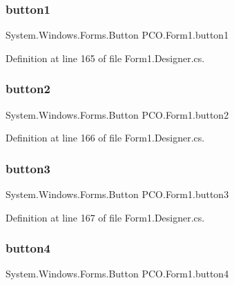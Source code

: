 \subsubsection{\texorpdfstring{button1}{button1}}
{\footnotesize\ttfamily System.\+Windows.\+Forms.\+Button P\+C\+O.\+Form1.\+button1\hspace{0.3cm}{\ttfamily [private]}}



Definition at line 165 of file Form1.\+Designer.\+cs.

\mbox{\label{classPCO_1_1Form1_ad629df09d9f3eb537456ea999592562f}} 
\subsubsection{\texorpdfstring{button2}{button2}}
{\footnotesize\ttfamily System.\+Windows.\+Forms.\+Button P\+C\+O.\+Form1.\+button2\hspace{0.3cm}{\ttfamily [private]}}



Definition at line 166 of file Form1.\+Designer.\+cs.

\mbox{\label{classPCO_1_1Form1_a4c4c4c6c02637dd42e4e1eb28ad0bb45}} 
\subsubsection{\texorpdfstring{button3}{button3}}
{\footnotesize\ttfamily System.\+Windows.\+Forms.\+Button P\+C\+O.\+Form1.\+button3\hspace{0.3cm}{\ttfamily [private]}}



Definition at line 167 of file Form1.\+Designer.\+cs.

\mbox{\label{classPCO_1_1Form1_a9632899f8786d9bf6dea208f92f2a9d1}} 
\subsubsection{\texorpdfstring{button4}{button4}}
{\footnotesize\ttfamily System.\+Windows.\+Forms.\+Button P\+C\+O.\+Form1.\+button4\hspace{0.3cm}{\ttfamily [private]}}



